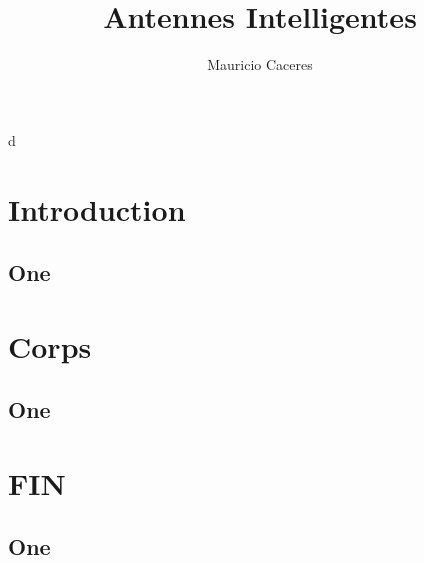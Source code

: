 \documentclass[11pt]{beamer}
\begin{document}
	\author{Mauricio Caceres}
	\title{Antennes Intelligentes}
	\subtitle{}
	\logo{}
	\institute{}
	\date{}
	\subject{}
	\frame[plain]{\maketitle}d
	\section{Introduction}
	\begin{frame}
	\subsection{One}
		\frametitle{}
	\end{frame}
	\section{Corps}
	\begin{frame}
		\subsection{One}
		\frametitle{}
	\end{frame}
	\section{FIN}
\begin{frame}
	\subsection{One}
	\frametitle{}
\end{frame}
\end{document}
